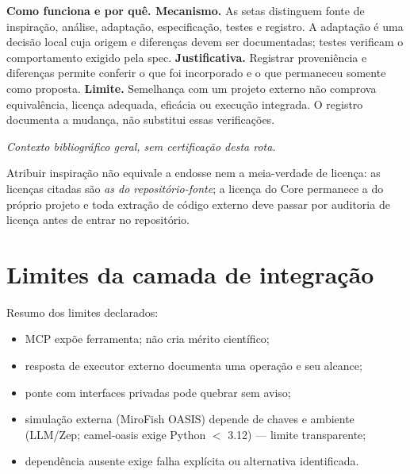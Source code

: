 \begin{descricao}
\textbf{Como funciona e por quê. Mecanismo.} As setas distinguem fonte de inspiração, análise, adaptação, especificação, testes e registro. A adaptação é uma decisão local cuja origem e diferenças devem ser documentadas; testes verificam o comportamento exigido pela spec.
\textbf{Justificativa.} Registrar proveniência e diferenças permite conferir o que foi incorporado e o que permaneceu somente como proposta.
\textbf{Limite.} Semelhança com um projeto externo não comprova equivalência, licença adequada, eficácia ou execução integrada. O registro documenta a mudança, não substitui essas verificações.
\end{descricao}


\noindent\textit{Contexto bibliográfico geral, sem certificação desta rota.} 


\begin{aviso}
Atribuir inspiração não equivale a endosse nem a meia-verdade de licença: as
licenças citadas são \emph{as do repositório-fonte}; a licença do Core permanece a
do próprio projeto e toda extração de código externo deve passar por auditoria de
licença antes de entrar no repositório.
\end{aviso}

\clearpage
\section{Limites da camada de integração}

\begin{limite}
Resumo dos limites declarados:
\begin{itemize}[leftmargin=1.3em,itemsep=1pt]
  \item MCP expõe ferramenta; não cria mérito científico;
  \item resposta de executor externo documenta uma operação e seu alcance;
  \item ponte com interfaces privadas pode quebrar sem aviso;
  \item simulação externa (MiroFish OASIS) depende de chaves e ambiente
        (LLM/Zep; camel-oasis exige Python $<$ 3.12) — limite transparente;
  \item dependência ausente exige falha explícita ou alternativa identificada.
\end{itemize}
\end{limite}

